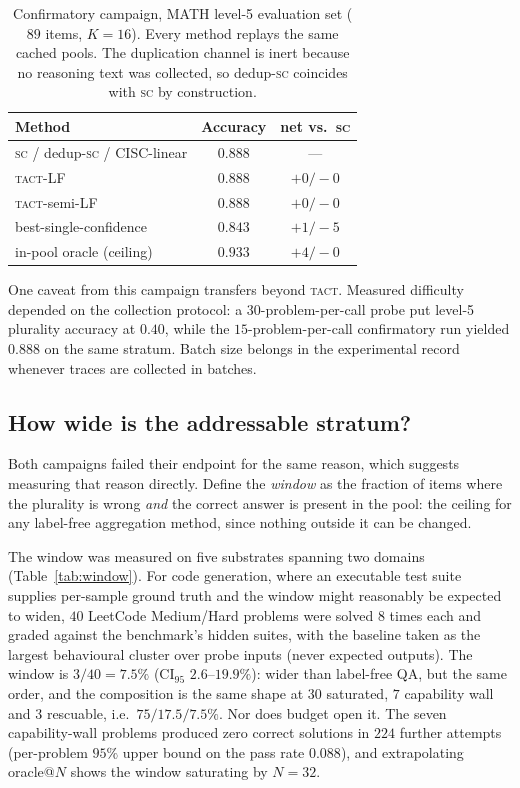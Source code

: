 \documentclass{article}
\newcommand{\SC}{\textsc{sc}}
\newcommand{\TACT}{\textsc{tact}}
\begin{document}
\begin{table}[t]
\caption{Confirmatory campaign, MATH level-5 evaluation set ($89$ items,
$K{=}16$). Every method replays the same cached pools. The duplication
channel is inert because no reasoning text was collected, so dedup-\SC{}
coincides with \SC{} by construction.}
\label{tab:hard}
\centering\footnotesize
\setlength{\tabcolsep}{4pt}
\begin{tabular}{l c c}
\toprule
Method & Accuracy & net vs.\ \SC \\
\midrule
\SC{} / dedup-\SC{} / CISC-linear & $0.888$ & --- \\
\TACT-LF & $0.888$ & $+0/-0$ \\
\TACT-semi-LF & $0.888$ & $+0/-0$ \\
best-single-confidence & $0.843$ & $+1/-5$ \\
\midrule
in-pool oracle (ceiling) & $0.933$ & $+4/-0$ \\
\bottomrule
\end{tabular}
\end{table}

One caveat from this campaign transfers beyond \TACT. Measured difficulty
depended on the collection protocol: a $30$-problem-per-call probe put
level-5 plurality accuracy at $0.40$, while the $15$-problem-per-call
confirmatory run yielded $0.888$ on the same stratum. Batch size belongs in
the experimental record whenever traces are collected in batches.

\subsection{How wide is the addressable stratum?}\label{sec:window}
Both campaigns failed their endpoint for the same reason, which suggests
measuring that reason directly. Define the \emph{window} as the fraction of
items where the plurality is wrong \emph{and} the correct answer is present
in the pool: the ceiling for any label-free aggregation method, since nothing
outside it can be changed.

The window was measured on five substrates spanning two domains
(Table~\ref{tab:window}). For code generation, where an executable test suite
supplies per-sample ground truth and the window might reasonably be expected
to widen, $40$ LeetCode Medium/Hard problems \citep{leetcodedataset} were
solved $8$ times each and graded against the benchmark's hidden suites, with
the baseline taken as the largest behavioural cluster over probe inputs
(never expected outputs). The window is $3/40=7.5\%$ (CI$_{95}$
$2.6$--$19.9\%$): wider than label-free QA, but the same order, and the
composition is the same shape at $30$ saturated, $7$ capability wall and $3$
rescuable, i.e.\ $75/17.5/7.5\%$. Nor does budget open it. The seven capability-wall problems
produced zero correct solutions in $224$ further attempts (per-problem $95\%$
upper bound on the pass rate $0.088$), and extrapolating oracle@$N$ shows the
window saturating by $N{=}32$.
\end{document}
